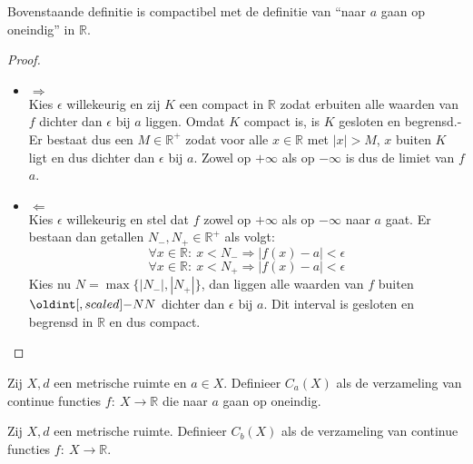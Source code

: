 \documentclass[main.tex]{subfiles}
\begin{document}
\begin{opm}
  Bovenstaande definitie is compactibel met de definitie van ``naar $a$ gaan op oneindig'' in $\mathbb{R}$.

  \begin{proof}
    \noindent
    \begin{itemize}
    \item $\Rightarrow$\\
      Kies $\epsilon$ willekeurig en zij $K$ een compact in $\mathbb{R}$ zodat erbuiten alle waarden van $f$ dichter dan $\epsilon$ bij $a$ liggen.
      Omdat $K$ compact is, is $K$ gesloten en begrensd.-
      Er bestaat dus een $M\in\mathbb{R}^{+}$ zodat voor alle $x\in \mathbb{R}$ met $|x|>M$, $x$ buiten $K$ ligt en dus dichter dan $\epsilon$ bij $a$.
      Zowel op $+\infty$ als op $-\infty$ is dus de limiet van $f$ $a$.
    \item $\Leftarrow$\\
      Kies $\epsilon$ willekeurig en stel dat $f$ zowel op $+\infty$ als op $-\infty$ naar $a$ gaat.
      Er bestaan dan getallen $N_{-},N_{+}\in\mathbb{R}^{+}$ als volgt:
      \[ \forall x\in \mathbb{R}:\ x < N_{-} \Rightarrow |f(x)-a|< \epsilon \]
      \[ \forall x\in \mathbb{R}:\ x < N_{+}  \Rightarrow |f(x)-a|< \epsilon \]
      Kies nu $N = \max\{|N_{-}|,|N_{+}|\}$, dan liggen alle waarden van $f$ buiten $\interval{-N}{N}$ dichter dan $\epsilon$ bij $a$.
      Dit interval is gesloten en begrensd in $\mathbb{R}$ en dus compact.
    \end{itemize}
  \end{proof}
\end{opm}

\begin{de}
  Zij $X,d$ een metrische ruimte en $a\in X$.
  Definieer $C_{a}(X)$ als de verzameling van continue functies $f:\ X \rightarrow \mathbb{R}$ die naar $a$ gaan op oneindig.
\end{de}

\begin{de}
  Zij $X,d$ een metrische ruimte.
  Definieer $C_{b}(X)$ als de verzameling van continue functies $f:\ X \rightarrow \mathbb{R}$.
\end{de}
\end{document}
